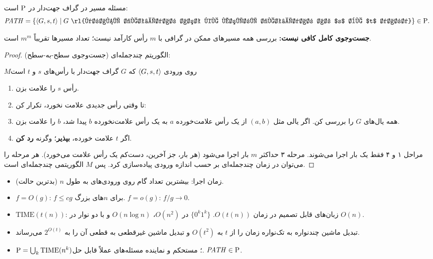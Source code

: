 \begin{theorem}
مسئله مسیر در گراف جهت‌دار در $\mathrm{P}$ است:
\[\prob{PATH}=\{\enc{G,s,t}\st G\ \text{\rl{گرافی جهت‌دار است که مسیری جهت‌دار از $s$ به $t$ دارد}}\}\in\cP.\]
\end{theorem}
\textbf{جست‌وجوی کامل کافی نیست:} بررسی همه مسیرهای ممکن در گرافی با $m$ رأس کارآمد نیست؛ تعداد مسیرها تقریباً $m^m$ است.
\begin{proof}
الگوریتم چندجمله‌ای (جست‌وجوی سطح-به-سطح):
\begin{algo}{$M$}{روی ورودی $\langle G,s,t\rangle$ که $G$ گراف جهت‌دار با رأس‌های $s$ و $t$ است}
\begin{enumerate}
\item رأس $s$ را علامت بزن.
\item تا وقتی رأس جدیدی علامت نخورد، تکرار کن:
\item \quad همه یال‌های $G$ را بررسی کن. اگر یالی مثل $(a,b)$ از یک رأس علامت‌خورده $a$ به یک رأس علامت‌نخورده $b$ پیدا شد، $b$ را علامت بزن.
\item اگر $t$ علامت خورده، \textbf{بپذیر}؛ وگرنه \textbf{رد کن}.
\end{enumerate}
\end{algo}
مراحل ۱ و ۴ فقط یک بار اجرا می‌شوند. مرحله ۳ حداکثر $m$ بار اجرا می‌شود (هر بار، جز آخرین، دست‌کم یک رأس علامت می‌خورد). هر مرحله را می‌توان در زمان چندجمله‌ای بر حسب اندازه ورودی پیاده‌سازی کرد. پس $M$ الگوریتمی چندجمله‌ای است.
\end{proof}

\begin{summary}
\begin{itemize}
\item زمان اجرا: بیشترین تعداد گام روی ورودی‌های به طول $n$ (بدترین حالت).
\item $f=O(g)$: $f\le cg$ برای $n$های بزرگ. $f=o(g)$: $f/g\to0$.
\item $\mathrm{TIME}(t(n))$: زبان‌های قابل تصمیم در زمان $O(t(n))$. $\{0^k1^k\}$ در $O(n^2)$، $O(n\log n)$ و با دو نوار در $O(n)$.
\item تبدیل ماشین چندنواره به تک‌نواره زمان را از $t$ به $O(t^2)$ و تبدیل ماشین غیرقطعی به قطعی آن را به $2^{O(t)}$ می‌رساند.
\item $\mathrm{P}=\bigcup_k\mathrm{TIME}(n^k)$؛ مستحکم و نماینده مسئله‌های عملاً قابل حل. $\mathit{PATH}\in\mathrm{P}$.
\end{itemize}
\end{summary}
